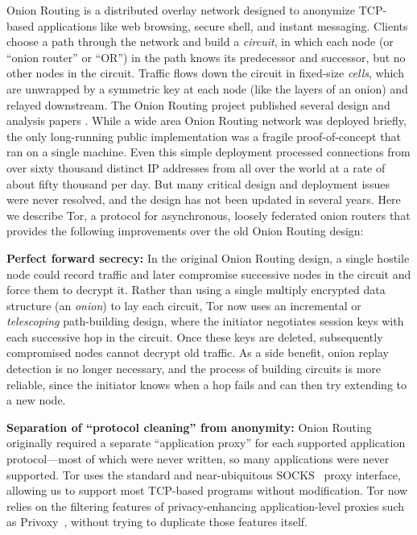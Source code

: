 \documentclass[twocolumn]{article}
\begin{document}
Onion Routing is a distributed overlay network designed to anonymize
TCP-based applications like web browsing, secure shell,
and instant messaging. Clients choose a path through the network and
build a \emph{circuit}, in which each node (or ``onion router'' or ``OR'')
in the path knows its predecessor and successor, but no other nodes in
the circuit.  Traffic flows down the circuit in fixed-size
\emph{cells}, which are unwrapped by a symmetric key at each node
(like the layers of an onion) and relayed downstream. The
Onion Routing project published several design and analysis
papers \cite{or-ih96,or-jsac98,or-discex00,or-pet00}. While a wide area Onion
Routing network was deployed briefly, the only long-running
public implementation was a fragile
proof-of-concept that ran on a single machine. Even this simple deployment
processed connections from over sixty thousand distinct IP addresses from
all over the world at a rate of about fifty thousand per day.
But many critical design and deployment issues were never
resolved, and the design has not been updated in several years. Here
we describe Tor, a protocol for asynchronous, loosely federated onion
routers that provides the following improvements over the old Onion
Routing design:

\textbf{Perfect forward secrecy:} In the original Onion Routing design,
a single hostile node could record traffic and
later compromise successive nodes in the circuit and force them
to decrypt it. Rather than using a single multiply encrypted data
structure (an \emph{onion}) to lay each circuit,
Tor now uses an incremental or \emph{telescoping} path-building design,
where the initiator negotiates session keys with each successive hop in
the circuit.  Once these keys are deleted, subsequently compromised nodes
cannot decrypt old traffic.  As a side benefit, onion replay detection
is no longer necessary, and the process of building circuits is more
reliable, since the initiator knows when a hop fails and can then try
extending to a new node.

\textbf{Separation of ``protocol cleaning'' from anonymity:}
Onion Routing originally required a separate ``application
proxy'' for each supported application protocol---most of which were
never written, so many applications were never supported.  Tor uses the
standard and near-ubiquitous SOCKS~\cite{socks4} proxy interface, allowing
us to support most TCP-based programs without modification.  Tor now
relies on the filtering features of privacy-enhancing
application-level proxies such as Privoxy~\cite{privoxy}, without trying
to duplicate those features itself.
\end{document}
